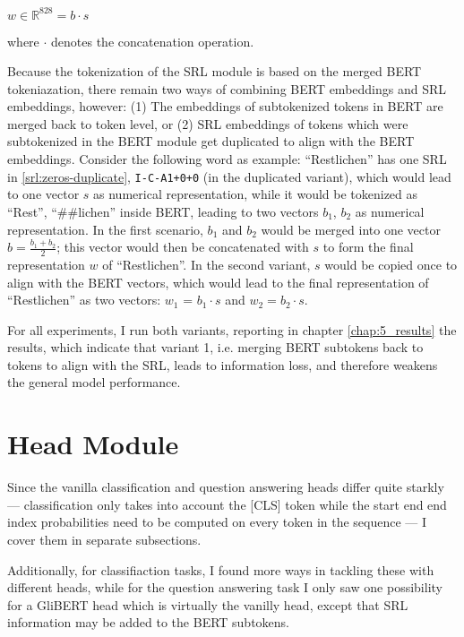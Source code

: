 $w \in \mathbb{R}^{828} = b \cdot  s$

where $\cdot$ denotes the concatenation operation.

Because the tokenization of the SRL module is based on the merged BERT tokeniazation,
there remain two ways of combining BERT embeddings and SRL embeddings, however: (1) The
embeddings of subtokenized tokens in BERT are merged back to token level, or (2) SRL
embeddings of tokens which were subtokenized in the BERT module get duplicated to align
with the BERT embeddings. Consider the following word as example: ``Restlichen'' has one
SRL in \ref{srl:zeros-duplicate}, \texttt{I-C-A1+0+0} (in the duplicated variant), which
would lead to one vector $s$ as numerical representation, while it would be tokenized as
``Rest'', ``\#\#lichen'' inside BERT, leading to two vectors $b_1$, $b_2$ as numerical
representation. In the first scenario, $b_1$ and $b_2$ would be merged into one vector
$b = \frac{b_1 + b_2}{2}$; this vector would then be concatenated
with $s$ to form the final representation $w$ of ``Restlichen''. In the second variant,
$s$ would be copied once to align with the BERT vectors, which would lead
to the final representation of ``Restlichen'' as two vectors: $w_1$ = $b_1 \cdot s$ and
$w_2 = b_2 \cdot s$.

For all experiments, I run both variants, reporting in chapter \ref{chap:5_results} the results,
which indicate that variant 1, i.e. merging BERT subtokens back to tokens to align with the SRL,
leads to information loss, and therefore weakens the general model performance.


\section{Head Module}

Since the vanilla classification and question answering heads differ quite
starkly --- classification only takes into account the [CLS] token while
the start end end index probabilities need to be computed on every token
in the sequence --- I cover them in separate subsections.

Additionally, for classifiaction tasks, I found more ways in tackling these
with different heads, while for the question answering task I only saw one
possibility for a GliBERT head which is virtually the vanilly head, except
that SRL information may be added to the BERT subtokens.


